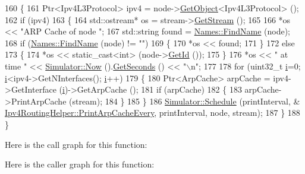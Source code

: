 \begin{DoxyCode}
160 \{
161   Ptr<Ipv4L3Protocol> ipv4 = node->\hyperlink{classns3_1_1Object_a13e18c00017096c8381eb651d5bd0783}{GetObject}<Ipv4L3Protocol> ();
162   \textcolor{keywordflow}{if} (ipv4)
163     \{
164       std::ostream* os = stream->\hyperlink{classns3_1_1OutputStreamWrapper_a0cf30a4188ab6fdae2b2ab74db11acc2}{GetStream} ();
165 
166       *os << \textcolor{stringliteral}{"ARP Cache of node "};
167       std::string found = \hyperlink{classns3_1_1Names_ab9664faf23569aaae64a2d1f65265045}{Names::FindName} (node);
168       \textcolor{keywordflow}{if} (\hyperlink{classns3_1_1Names_ab9664faf23569aaae64a2d1f65265045}{Names::FindName} (node) != \textcolor{stringliteral}{""})
169         \{
170           *os << found;
171         \}
172       \textcolor{keywordflow}{else}
173         \{
174           *os << static\_cast<int> (node->\hyperlink{classns3_1_1Node_aaf49b64a843565ce3812326313b370ac}{GetId} ());
175         \}
176       *os << \textcolor{stringliteral}{" at time "} << \hyperlink{classns3_1_1Simulator_ac3178fa975b419f7875e7105be122800}{Simulator::Now} ().\hyperlink{classns3_1_1Time_a8f20d5c3b0902d7b4320982f340b57c8}{GetSeconds} () << \textcolor{stringliteral}{"\(\backslash\)n"};
177 
178       \textcolor{keywordflow}{for} (uint32\_t \hyperlink{bernuolliDistribution_8m_a6f6ccfcf58b31cb6412107d9d5281426}{i}=0; \hyperlink{bernuolliDistribution_8m_a6f6ccfcf58b31cb6412107d9d5281426}{i}<ipv4->GetNInterfaces(); \hyperlink{bernuolliDistribution_8m_a6f6ccfcf58b31cb6412107d9d5281426}{i}++)
179         \{
180           Ptr<ArpCache> arpCache = ipv4->GetInterface (\hyperlink{bernuolliDistribution_8m_a6f6ccfcf58b31cb6412107d9d5281426}{i})->GetArpCache ();
181           \textcolor{keywordflow}{if} (arpCache)
182             \{
183               arpCache->PrintArpCache (stream);
184             \}
185         \}
186       \hyperlink{classns3_1_1Simulator_a671882c894a08af4a5e91181bf1eec13}{Simulator::Schedule} (printInterval, &
      \hyperlink{classns3_1_1Ipv4RoutingHelper_a34f51ee22efe6ae308e4843741e80388}{Ipv4RoutingHelper::PrintArpCacheEvery}, printInterval, node, stream);
187     \}
188 \}
\end{DoxyCode}


Here is the call graph for this function\+:




Here is the caller graph for this function\+:


